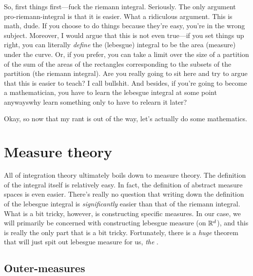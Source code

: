 So, first things first---fuck the riemann integral.  Seriously.  The only argument pro-riemann-integral is that it is easier.  What a ridiculous argument.  This is math, dude.  If you choose to do things because they're easy, you're in the wrong subject.  Moreover, I would argue that this is not even true---if you set things up right, you can literally \emph{define} the (lebesgue) integral to be the area (measure) under the curve.  Or, if you prefer, you can take a limit over the size of a partition of the sum of the areas of the rectangles corresponding to the subsets of the partition (the riemann integral).  Are you really going to sit here and try to argue that this is easier to teach?  I call bullshit.  And besides, if you're going to become a mathematician, you have to learn the lebesgue integral at some point anyways\textellipsis why learn something only to have to relearn it later?

Okay, so now that my rant is out of the way, let's actually do some mathematics.

\section{Measure theory}

All of integration theory ultimately boils down to measure theory.  The definition of the integral itself is relatively easy.  In fact, the definition of abstract measure spaces is even easier.  There's really no question that writing down the definition of the lebesgue integral is \emph{significantly} easier than that of the riemann integral.  What is a bit tricky, however, is constructing specific measures.  In our case, we will primarily be concerned with constructing lebesgue measure (on $\mathbb{R} ^d$), and this is really the only part that is a bit tricky.  Fortunately, there is a \emph{huge} theorem that will just spit out lebesgue measure for us, \emph{the }.

\subsection{Outer-measures}

